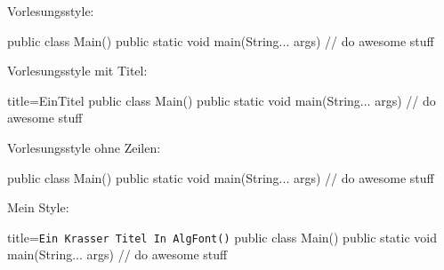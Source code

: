 \documentclass[11pt,letterpaper]{article}
\begin{document}
Vorlesungsstyle:
\begin{VLCode}[autogobble]{}
  public class Main() {
    public static void main(String... args){
      // do awesome stuff
    }
  }
\end{VLCode}
Vorlesungsstyle mit Titel:
\begin{VLCode}[autogobble]{title=EinTitel}
  public class Main() {
    public static void main(String... args){
      // do awesome stuff
    }
  }
\end{VLCode}

Vorlesungsstyle ohne Zeilen:
\begin{VLCode}[autogobble, linenos=false]{}
  public class Main() {
    public static void main(String... args){
      // do awesome stuff
    }
  }
\end{VLCode}

Mein Style:
\begin{codeBlock}[autogobble]{title={\texttt{Ein Krasser Titel In AlgFont()}}}
  public class Main() {
    public static void main(String... args){
      // do awesome stuff
    }
  }
\end{codeBlock}
\end{document}
